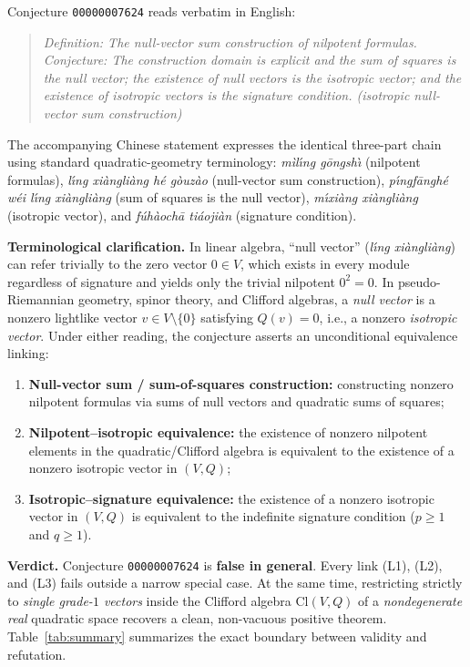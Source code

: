 \documentclass[11pt]{article}
\theoremstyle{definition}
\newcommand{\Cl}{\mathrm{Cl}}
\begin{document}
Conjecture \texttt{00000007624} reads verbatim in English:
\begin{quote}
\emph{Definition: The null-vector sum construction of nilpotent formulas. Conjecture:
The construction domain is explicit and the sum of squares is the null vector; the
existence of null vectors is the isotropic vector; and the existence of isotropic vectors
is the signature condition. (isotropic null-vector sum construction)}
\end{quote}
The accompanying Chinese statement expresses the identical three-part chain using standard
quadratic-geometry terminology: \emph{m\`il\'\i ng g\=ongsh\`\i} (nilpotent formulas),
\emph{l\'\i ng xi\`angli\`ang h\'e g\`ouz\`ao} (null-vector sum construction),
\emph{p\'\i ngf\=angh\'e w\'ei l\'\i ng xi\`angli\`ang} (sum of squares is the null
vector), \emph{m\'\i xi\`ang xi\`angli\`ang} (isotropic vector), and
\emph{f\'uh\`aoch\=a ti\'aoji\`an} (signature condition).

\medskip
\noindent\textbf{Terminological clarification.}
In linear algebra, ``null vector'' (\emph{l\'\i ng xi\`angli\`ang}) can refer trivially to
the zero vector $0 \in V$, which exists in every module regardless of signature and yields
only the trivial nilpotent $0^2 = 0$. In pseudo-Riemannian geometry, spinor theory, and
Clifford algebras, a \emph{null vector} is a nonzero lightlike vector $v \in V \setminus \{0\}$
satisfying $Q(v) = 0$, i.e., a nonzero \emph{isotropic vector}. Under either reading, the
conjecture asserts an unconditional equivalence linking:
\begin{enumerate}
  \item[\textbf{(L1)}] \textbf{Null-vector sum / sum-of-squares construction:}
    constructing nonzero nilpotent formulas via sums of null vectors and quadratic sums of
    squares;
  \item[\textbf{(L2)}] \textbf{Nilpotent--isotropic equivalence:}
    the existence of nonzero nilpotent elements in the quadratic/Clifford algebra is
    equivalent to the existence of a nonzero isotropic vector in $(V, Q)$;
  \item[\textbf{(L3)}] \textbf{Isotropic--signature equivalence:}
    the existence of a nonzero isotropic vector in $(V, Q)$ is equivalent to the
    indefinite signature condition ($p \ge 1$ and $q \ge 1$).
\end{enumerate}

\noindent\textbf{Verdict.}
Conjecture \texttt{00000007624} is \textbf{false in general}. Every link (L1), (L2), and
(L3) fails outside a narrow special case. At the same time, restricting strictly to
\emph{single grade-$1$ vectors} inside the Clifford algebra $\Cl(V, Q)$ of a
\emph{nondegenerate real} quadratic space recovers a clean, non-vacuous positive theorem.
Table~\ref{tab:summary} summarizes the exact boundary between validity and refutation.
\end{document}
